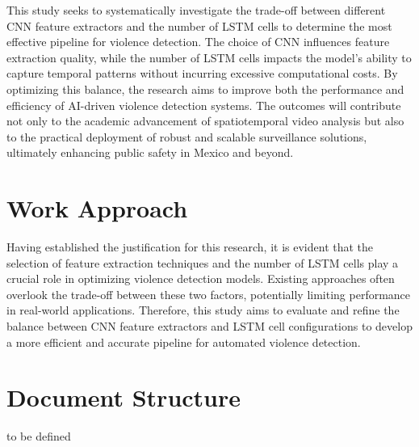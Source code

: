 This study seeks to systematically investigate the trade-off 
between different CNN feature extractors and the number of LSTM 
cells to determine the most effective pipeline for violence 
detection. The choice of CNN influences feature extraction 
quality, while the number of LSTM cells impacts the model's 
ability to capture temporal patterns without incurring 
excessive computational costs. By optimizing this balance, 
the research aims to improve both the performance and 
efficiency of AI-driven violence detection systems. The 
outcomes will contribute not only to the academic advancement 
of spatiotemporal video analysis but also to the practical 
deployment of robust and scalable surveillance solutions, 
ultimately enhancing public safety in Mexico and beyond.

\section{Work Approach}

Having established the justification for this research, 
it is evident that the selection of feature extraction 
techniques and the number of LSTM cells play a crucial 
role in optimizing violence detection models. Existing 
approaches often overlook the trade-off between these 
two factors, potentially limiting performance in real-world 
applications. Therefore, this study aims to evaluate and 
refine the balance between CNN feature extractors and LSTM 
cell configurations to develop a more efficient and accurate 
pipeline for automated violence detection.

\section{Document Structure}

to be defined